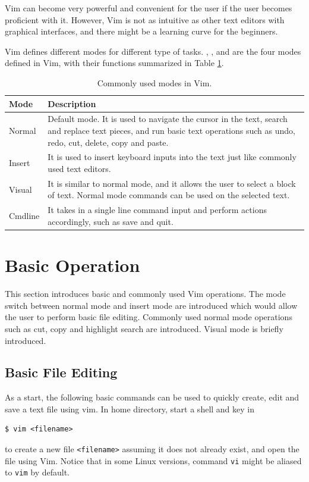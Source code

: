 Vim can become very powerful and convenient for the user if the user becomes proficient with it. However, Vim is not as intuitive as other text editors with graphical interfaces, and there might be a learning curve for the beginners.

Vim defines different modes for different type of tasks. , ,  and  are the four modes defined in Vim, with their functions summarized in Table \ref{ch:tfe:tab:vimmodes}.

\begin{table}[!htb]
  \centering \caption{Commonly used modes in Vim.}\label{ch:tfe:tab:vimmodes}
  \begin{tabularx}{\textwidth}{lX}
    \hline
    Mode & Description \\ \hline
    Normal & Default mode. It is used to navigate the cursor in the text, search and replace text pieces, and run basic text operations such as undo, redo, cut, delete, copy and paste. \\ 
    Insert & It is used to insert keyboard inputs into the text just like commonly used text editors. \\ 
    Visual & It is similar to normal mode, and it allows the user to select a block of text. Normal mode commands can be used on the selected text. \\ 
    Cmdline & It takes in a single line command input and perform actions accordingly, such as save and quit. \\
    \hline
  \end{tabularx}
\end{table}

\section{Basic Operation}

This section introduces basic and commonly used Vim operations. The mode switch between normal mode and insert mode are introduced which would allow the user to perform basic file editing. Commonly used normal mode operations such as cut, copy and highlight search are introduced. Visual mode is briefly introduced.

\subsection{Basic File Editing}

As a start, the following basic commands can be used to quickly create, edit and save a text file using vim. In home directory, start a shell and key in
\begin{lstlisting}
$ vim <filename>
\end{lstlisting}
to create a new file \verb|<filename>| assuming it does not already exist, and open the file using Vim. Notice that in some Linux versions, command \verb|vi| might be aliased to \verb|vim| by default.

